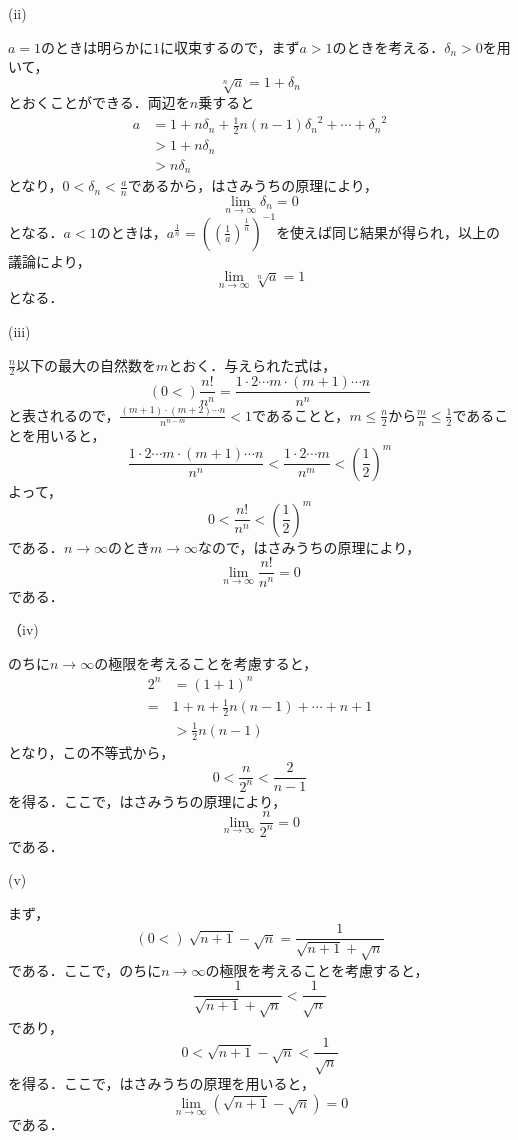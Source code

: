 \documentclass[dvipdfmx,uplatex,11pt]{jsarticle}
\theoremstyle{definition}
\begin{document}
\newpage
(ii)
\begin{leftbar}
    $a=1$のときは明らかに$1$に収束するので，まず$a>1$のときを考える．$\delta_n >0$を用いて，
    \[
        \sqrt[n]{a} =1+\delta_n
    \]
    とおくことができる．両辺を$n$乗すると
    \begin{align*}
        a& = 1+ n \delta_n + \frac{1}{2}n(n-1) {\delta_n}^2 + \cdots + {\delta_n}^2 \\
        &>1+n \delta_n \\
        & >n \delta_n
    \end{align*}
    となり，$0<\delta_n <\frac{a}{n}$であるから，はさみうちの原理により，
    \[
        \lim_{n \to \infty} \delta_n =0
    \]
    となる．$a<1$のときは，$a^{\frac{1}{n}}=\left(\left(\frac{1}{a}\right)^{\frac{1}{n}}\right)^{-1}$を使えば同じ結果が得られ，以上の議論により，
    \[
        \lim_{n \to \infty} \sqrt[n]{a} =1
    \]
    となる．
\end{leftbar}
\newpage
(iii)
\begin{leftbar}
    $\frac{n}{2}$以下の最大の自然数を$m$とおく．与えられた式は，
    \[
       \left( 0  < \right) \frac{n!}{n^n}  = \frac{1 \cdot 2 \cdots m \cdot (m+1) \cdots n}{n^n}
    \]
    と表されるので，$\frac{(m+1) \cdot (m+2) \cdots n}{n^{n-m}} <1$であることと，$m \le \frac{n}{2}$から$\frac{m}{n} \le \frac{1}{2}$であることを用いると，
    \[
        \frac{1 \cdot 2 \cdots m \cdot (m+1) \cdots n}{n^n} < \frac{1 \cdot 2 \cdots m}{n^m} <\left(\frac{1}{2}\right)^m
    \]
    よって，
    \[
        0 < \frac{n!}{n^n} <\left(\frac{1}{2}\right)^m
    \]
    である．$n \to \infty$のとき$m \to \infty$なので，はさみうちの原理により，
    \[
        \lim_{n \to \infty}\frac{n!}{n^n} =0
    \]
    である．
\end{leftbar}
\newpage
（iv)
\begin{leftbar}
    のちに$n \to \infty$の極限を考えることを考慮すると，
    \begin{align*}
        2^n &= (1+1)^n \\
        =& 1+n +\frac{1}{2} n(n-1)+ \cdots +n+1 \\
        & > \frac{1}{2} n(n-1)
    \end{align*}
    となり，この不等式から，
    \[
        0< \frac{n}{2^n} < \frac{2}{n-1}
    \]
    を得る．ここで，はさみうちの原理により，
    \[
        \lim_{n \to \infty} \frac{n}{2^n}=0
    \]
    である．
\end{leftbar}
\newpage
(v)
\begin{leftbar}
    まず，
    \[
       (0<) ~\sqrt{n+1} - \sqrt{n} = \frac{1}{\sqrt{n+1} + \sqrt{n}}
    \]
    である．ここで，のちに$n \to \infty$の極限を考えることを考慮すると，
    \[
    \frac{1}{\sqrt{n+1} + \sqrt{n}} < \frac{1}{\sqrt{n}} 
    \]
    であり，
    \[
        0< \sqrt{n+1} - \sqrt{n} <\frac{1}{\sqrt{n}}
    \]
    を得る．ここで，はさみうちの原理を用いると，
    \[
        \lim_{n \to \infty} (\sqrt{n+1} - \sqrt{n} )=0
    \]
    である．
\end{leftbar}
\end{document}
